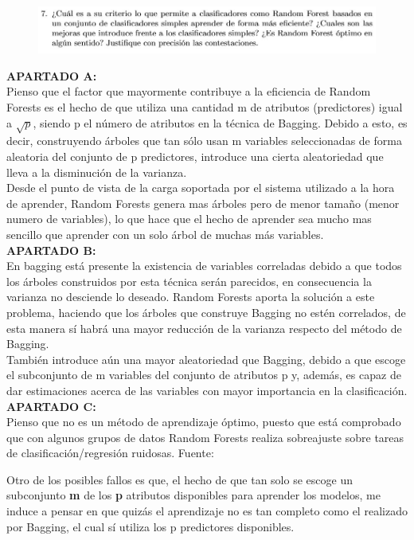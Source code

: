 \begin{figure}[H]
	\includegraphics[scale=0.65]{imagenes/7} 
\end{figure}

\textbf{APARTADO A:}\\
Pienso que el factor que mayormente contribuye a la eficiencia de Random Forests es el hecho de que utiliza una cantidad m de atributos (predictores) igual a $\sqrt{p}$, siendo p el número de atributos en la técnica de Bagging. Debido a esto, es decir, construyendo árboles que tan sólo usan m variables seleccionadas de forma aleatoria del conjunto de p predictores, introduce una cierta aleatoriedad que lleva a la disminución de la varianza.\\
Desde el punto de vista de la carga soportada por el sistema utilizado a la hora de aprender, Random Forests genera mas árboles pero de menor tamaño (menor numero de variables), lo que hace que el hecho de aprender sea mucho mas sencillo que aprender con un solo árbol de muchas más variables.\\

\textbf{APARTADO B:}\\
En bagging está presente la existencia de variables correladas debido a que todos los árboles construidos por esta técnica serán parecidos, en consecuencia la varianza no desciende lo deseado.
Random Forests aporta la solución a este problema, haciendo que los árboles que construye Bagging no estén correlados, de esta manera sí habrá una mayor reducción de la varianza respecto del método de Bagging.\\
También introduce aún una mayor aleatoriedad que Bagging, debido a que escoge el subconjunto de m variables del conjunto de atributos p y, además, es capaz de dar estimaciones acerca de las variables con mayor importancia en la clasificación.\\

\textbf{APARTADO C:}\\
Pienso que no es un método de aprendizaje óptimo, puesto que está comprobado que con algunos grupos de datos Random Forests realiza sobreajuste sobre tareas de clasificación/regresión ruidosas.
Fuente:\cite{ref2}

Otro de los posibles fallos es que, el hecho de que tan solo se escoge un subconjunto \textbf{m} de los \textbf{p} atributos disponibles para aprender los modelos, me induce a pensar en que quizás el aprendizaje no es tan completo como el realizado por Bagging, el cual sí utiliza los p predictores disponibles.


\newpage





